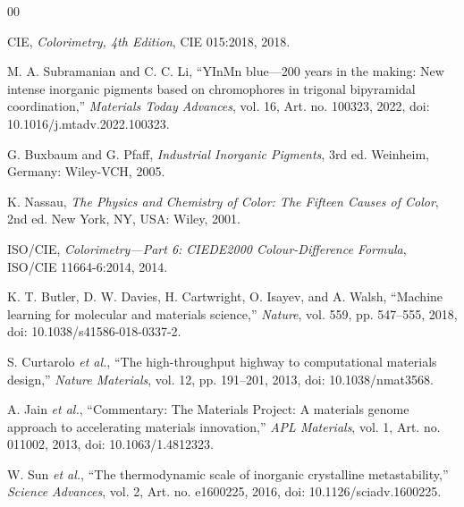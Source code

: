 \documentclass[conference]{IEEEtran}
\begin{document}
\begin{thebibliography}{00}

 CIE, \emph{Colorimetry, 4th Edition}, CIE 015:2018, 2018.

 M. A. Subramanian and C. C. Li, ``YInMn blue---200 years in the making: New intense inorganic pigments based on chromophores in trigonal bipyramidal coordination,'' \emph{Materials Today Advances}, vol. 16, Art. no. 100323, 2022, doi: 10.1016/j.mtadv.2022.100323.

 G. Buxbaum and G. Pfaff, \emph{Industrial Inorganic Pigments}, 3rd ed. Weinheim, Germany: Wiley-VCH, 2005.

 K. Nassau, \emph{The Physics and Chemistry of Color: The Fifteen Causes of Color}, 2nd ed. New York, NY, USA: Wiley, 2001.

 ISO/CIE, \emph{Colorimetry---Part 6: CIEDE2000 Colour-Difference Formula}, ISO/CIE 11664-6:2014, 2014.

 K. T. Butler, D. W. Davies, H. Cartwright, O. Isayev, and A. Walsh, ``Machine learning for molecular and materials science,'' \emph{Nature}, vol. 559, pp. 547--555, 2018, doi: 10.1038/s41586-018-0337-2.

 S. Curtarolo \emph{et al.}, ``The high-throughput highway to computational materials design,'' \emph{Nature Materials}, vol. 12, pp. 191--201, 2013, doi: 10.1038/nmat3568.

 A. Jain \emph{et al.}, ``Commentary: The Materials Project: A materials genome approach to accelerating materials innovation,'' \emph{APL Materials}, vol. 1, Art. no. 011002, 2013, doi: 10.1063/1.4812323.

 W. Sun \emph{et al.}, ``The thermodynamic scale of inorganic crystalline metastability,'' \emph{Science Advances}, vol. 2, Art. no. e1600225, 2016, doi: 10.1126/sciadv.1600225.

\end{thebibliography}
\end{document}
